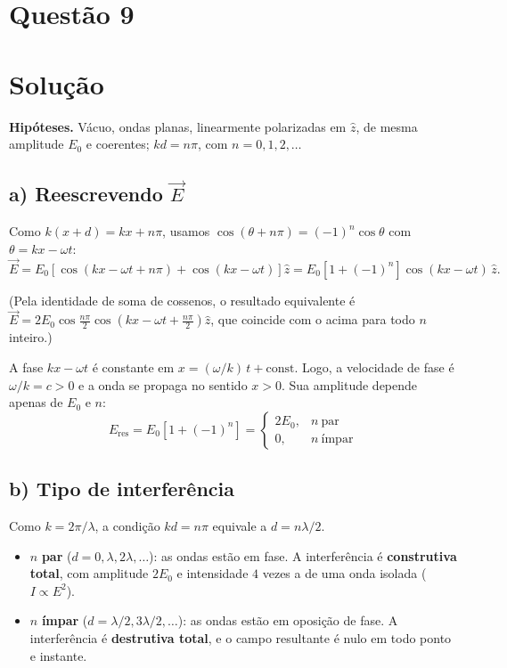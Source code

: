 \documentclass{article}%
\begin{document}
\section*{Questão 9}

\section*{Solução}

\textbf{Hipóteses.} Vácuo, ondas planas, linearmente polarizadas em $\hat z$, de mesma amplitude $E_0$ e coerentes; $kd=n\pi$, com $n=0,1,2,\dots$

\subsection*{a) Reescrevendo $\vec E$}

Como $k(x+d)=kx+n\pi$, usamos $\cos(\theta+n\pi)=(-1)^n\cos\theta$ com $\theta=kx-\omega t$:
\[
\vec E=E_0\left[\cos(kx-\omega t+n\pi)+\cos(kx-\omega t)\right]\hat z
=E_0\left[1+(-1)^n\right]\cos(kx-\omega t)\,\hat z .
\]

(Pela identidade de soma de cossenos, o resultado equivalente é $\vec E=2E_0\cos\frac{n\pi}{2}\cos\!\left(kx-\omega t+\frac{n\pi}{2}\right)\hat z$, que coincide com o acima para todo $n$ inteiro.)

A fase $kx-\omega t$ é constante em $x=(\omega/k)\,t+\text{const.}$ Logo, a velocidade de fase é $\omega/k=c>0$ e a onda se propaga no sentido $x>0$. Sua amplitude depende apenas de $E_0$ e $n$:
\[
\boxed{E_{\text{res}}=E_0\left[1+(-1)^n\right]=\begin{cases}2E_0,& n\ \text{par}\\[2pt] 0,& n\ \text{ímpar}\end{cases}}
\]

\subsection*{b) Tipo de interferência}

Como $k=2\pi/\lambda$, a condição $kd=n\pi$ equivale a $d=n\lambda/2$.

\begin{itemize}
\item $n$ \textbf{par} ($d=0,\lambda,2\lambda,\dots$): as ondas estão em fase. A interferência é \textbf{construtiva total}, com amplitude $2E_0$ e intensidade $4$ vezes a de uma onda isolada ($I\propto E^2$).
\item $n$ \textbf{ímpar} ($d=\lambda/2,3\lambda/2,\dots$): as ondas estão em oposição de fase. A interferência é \textbf{destrutiva total}, e o campo resultante é nulo em todo ponto e instante.
\end{itemize}
\end{document}
